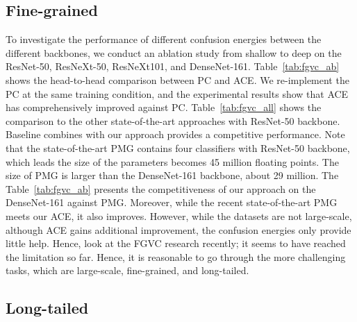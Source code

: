 \documentclass{article}
\begin{document}
\subsection{Fine-grained}


To investigate the performance of different confusion energies between the different backbones, we conduct an ablation study from shallow to deep on the ResNet-50, ResNeXt-50, ResNeXt101, and DenseNet-161. Table~\ref{tab:fgvc_ab} shows the head-to-head comparison between PC and ACE.  We re-implement the PC at the same training condition, and the experimental results show that ACE has comprehensively improved against PC. Table~\ref{tab:fgvc_all} shows the comparison to the other state-of-the-art approaches with ResNet-50 backbone. Baseline combines with our approach provides a competitive performance. Note that the state-of-the-art PMG \cite{du2020fine} contains four classifiers with ResNet-50 backbone, which leads the size of the parameters becomes 45 million floating points. The size of PMG is larger than the DenseNet-161 backbone, about 29 million. The Table~\ref{tab:fgvc_ab} presents the competitiveness of our approach on the DenseNet-161 against PMG. Moreover, while the recent state-of-the-art PMG meets our ACE, it also improves. However, while the datasets are not large-scale, although ACE gains additional improvement, the confusion energies only provide little help. Hence, look at the FGVC research recently; it seems to have reached the limitation so far. Hence, it is reasonable to go through the more challenging tasks, which are large-scale, fine-grained, and long-tailed.

\subsection{Long-tailed}
\end{document}
